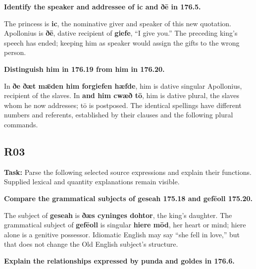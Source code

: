 \textbf{Identify the speaker and addressee of ic and ðē in 176.5.}

The princess is \textbf{ic}, the nominative giver and speaker of this new quotation. Apollonius is \textbf{ðē}, dative recipient of \textbf{giefe}, “I give you.” The preceding king’s speech has ended; keeping him as speaker would assign the gifts to the wrong person.

\textbf{Distinguish him in 176.19 from him in 176.20.}

In \textbf{ðe ðæt mǣden him forgiefen hæfde}, him is dative singular Apollonius, recipient of the slaves. In \textbf{and him cwæð tō}, him is dative plural, the slaves whom he now addresses; tō is postposed. The identical spellings have different numbers and referents, established by their clauses and the following plural commands.

\subsection*{R03}

\textbf{Task:} Parse the following selected source expressions and explain their functions. Supplied lexical and quantity explanations remain visible.

\textbf{Compare the grammatical subjects of geseah 175.18 and gefēoll 175.20.}

The subject of \textbf{geseah} is \textbf{ðæs cyninges dohtor}, the king’s daughter. The grammatical subject of \textbf{gefēoll} is singular \textbf{hiere mōd}, her heart or mind; hiere alone is a genitive possessor. Idiomatic English may say “she fell in love,” but that does not change the Old English subject’s structure.

\textbf{Explain the relationships expressed by punda and goldes in 176.6.}

